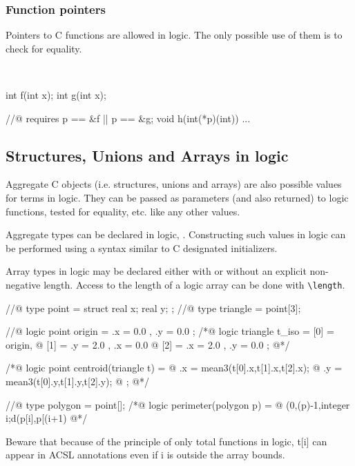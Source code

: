 \subsubsection{Function pointers}

Pointers to C functions are allowed in logic. The only possible use of
them is to check for equality.

\begin{example}
~
\begin{listing-nonumber}
int f(int x);
int g(int x);

//@ requires p == &f || p == &g;
void h(int(*p)(int)) {
...
}
\end{listing-nonumber}
\end{example}

\subsection{Structures, Unions and Arrays in logic}
\label{sec:aggregate}

Aggregate C objects (i.e. structures, unions and arrays) are also
possible values for terms in logic. They can be passed as parameters (and
also returned) to logic functions, tested for equality, etc. like any
other values.

Aggregate types can be declared in logic, 
. Constructing such values in logic can be
performed using a syntax similar to C designated initializers.

\begin{example}
Array types in logic may be declared either with or without an
explicit non-negative length. Access to the length of a logic array
can be done with \lstinline|\length|.

\begin{listing-nonumber}
//@ type point = struct { real x; real y; };
//@ type triangle = point[3];

//@ logic point origin = { .x = 0.0 , .y = 0.0 };
/*@ logic triangle t_iso = { [0] = origin,
  @                          [1] = { .y = 2.0 , .x = 0.0 }
  @                          [2] = { .x = 2.0 , .y = 0.0 }};
  @*/

/*@ logic point centroid(triangle t) = {
  @    .x = mean3(t[0].x,t[1].x,t[2].x);
  @    .y = mean3(t[0].y,t[1].y,t[2].y);
  @ };
  @*/

//@ type polygon = point[];
/*@ logic perimeter(polygon p) =
  @   \sum(0,\length(p)-1,\lambda integer i;d(p[i],p[(i+1) %
  @*/
\end{listing-nonumber}
Beware that because of the principle of only total functions in logic,
t[i] can appear in ACSL annotations even if i is outside the array bounds.

\end{example}

